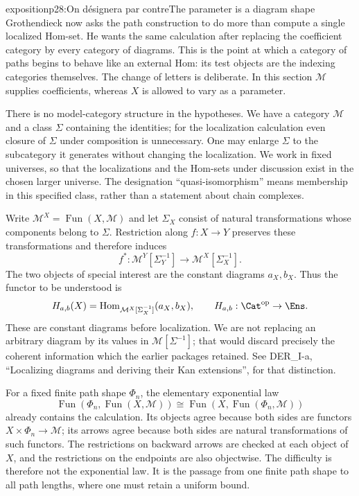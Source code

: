 \begin{dcomment}{exposition}{p28:On désignera par contre}{The parameter is a diagram shape}
Grothendieck now asks the path construction to do more than compute a single localized Hom-set. He wants the same calculation after replacing the coefficient category by every category of diagrams. This is the point at which a category of paths begins to behave like an external Hom: its test objects are the indexing categories themselves. The change of letters is deliberate. In this section $\mathcal M$ supplies coefficients, whereas $X$ is allowed to vary as a parameter.

There is no model-category structure in the hypotheses. We have a category $\mathcal M$ and a class $\Sigma$ containing the identities; for the localization calculation even closure of $\Sigma$ under composition is unnecessary. One may enlarge $\Sigma$ to the subcategory it generates without changing the localization. We work in fixed universes, so that the localizations and the Hom-sets under discussion exist in the chosen larger universe. The designation ``quasi-isomorphism'' means membership in this specified class, rather than a statement about chain complexes.

Write $\mathcal M^X=\operatorname{Fun}(X,\mathcal M)$ and let $\Sigma_X$ consist of natural transformations whose components belong to $\Sigma$. Restriction along $f:X\to Y$ preserves these transformations and therefore induces
\[
 f^*: \mathcal M^Y[\Sigma_Y^{-1}]
       \longrightarrow \mathcal M^X[\Sigma_X^{-1}].
\]
The two objects of special interest are the constant diagrams $a_X,b_X$. Thus the functor to be understood is
\[
 H_{a,b}(X)=\operatorname{Hom}_{\mathcal M^X[\Sigma_X^{-1}]}(a_X,b_X),
 \qquad H_{a,b}:\Cat^{\mathrm{op}}\to\Ens.
\]
These are constant diagrams before localization. We are not replacing an arbitrary diagram by its values in $\mathcal M[\Sigma^{-1}]$; that would discard precisely the coherent information which the earlier packages retained. See DER\_I-a, ``Localizing diagrams and deriving their Kan extensions'', for that distinction.

For a fixed finite path shape $\Phi_n$, the elementary exponential law
\[
 \operatorname{Fun}(\Phi_n,\operatorname{Fun}(X,\mathcal M))
 \cong\operatorname{Fun}(X,\operatorname{Fun}(\Phi_n,\mathcal M))
\]
already contains the calculation. Its objects agree because both sides are functors $X\times\Phi_n\to\mathcal M$; its arrows agree because both sides are natural transformations of such functors. The restrictions on backward arrows are checked at each object of $X$, and the restrictions on the endpoints are also objectwise. The difficulty is therefore not the exponential law. It is the passage from one finite path shape to all path lengths, where one must retain a uniform bound.
\end{dcomment}

